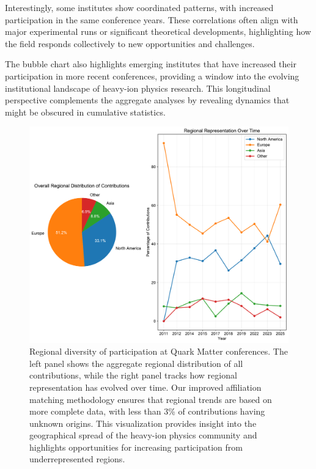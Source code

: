 \documentclass[a4paper,11pt]{article}
\begin{document}
Interestingly, some institutes show coordinated patterns, with increased participation in the same conference years. These correlations often align with major experimental runs or significant theoretical developments, highlighting how the field responds collectively to new opportunities and challenges.

The bubble chart also highlights emerging institutes that have increased their participation in more recent conferences, providing a window into the evolving institutional landscape of heavy-ion physics research. This longitudinal perspective complements the aggregate analyses by revealing dynamics that might be obscured in cumulative statistics.

\begin{figure}[H]
\centering
\includegraphics[width=\textwidth]{figures/regional_diversity.pdf}
\caption{Regional diversity of participation at Quark Matter conferences. The left panel shows the aggregate regional distribution of all contributions, while the right panel tracks how regional representation has evolved over time. Our improved affiliation matching methodology ensures that regional trends are based on more complete data, with less than 3\% of contributions having unknown origins. This visualization provides insight into the geographical spread of the heavy-ion physics community and highlights opportunities for increasing participation from underrepresented regions.}
\label{fig:regional_diversity}
\end{figure}
\end{document}
